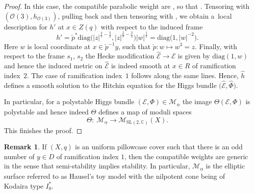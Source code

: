 \documentclass[10pt,a4paper]{amsart}
\numberwithin{equation}{section}
\theoremstyle{definition}
\newtheorem{rema}[theo]{Remark}
\renewcommand{\to}{\rightarrow}
\newcommand{\ualpha}{\underline{\alpha}}
\newcommand{\calE}{\mathcal{E}}
\newcommand{\calM}{\mathcal{M}}
\newcommand{\calO}{\mathcal{O}}
\newcommand{\CC}{\mathbb{C}}
\newcommand{\diag}{\mathrm{diag}}
\newcommand{\SL}{\mathrm{SL}}
\begin{document}
\begin{proof}
 In this case, the compatible parabolic weight are \smash{$\ualpha_y=\bigl(\frac34, \frac14\bigr)$}, so that \smash{$h=\diag\bigl( \vert z \vert^{\frac{4}{3}}, \vert z \vert^{\frac{2}{3}}\bigr)$}. Tensoring with $(\calO(3),h_{\calO(3)})$, pulling back and then tensoring with , we obtain a~local description for $h'$ at $x \in Z(q)$ with respect to the induced frame
 \[ h'= \check{p}^*\diag\bigl( \vert z \vert^{\frac{4}{3}-\frac32}, \vert z \vert^{\frac{2}{3}-\frac32}\bigr) \vert w \vert^{\frac12}= \diag\bigl( 1, \vert w \vert^{-2} \bigr).
 \]
 Here $w$ is local coordinate at $x \in \check{p}^{-1}y$, such that $\check{p}\colon w \mapsto w^3=z$. Finally, with respect to the frame $s_1$, $s_2$ the Hecke modification $\hat{\calE} \to \calE$ is given by $\diag( 1, w)$ and hence the induced metric on $\hat{\calE}$ is indeed smooth at $x \in R$ of ramification index~$2$. The case of ramification index~$1$ follows along the same lines. Hence, $\hat{h}$ defines a smooth solution to the Hitchin equation for the Higgs bundle $\bigl(\hat{\calE},\hat{\Phi}\bigr)$.

 In particular, for a polystable Higgs bundle $(\calE,\Phi) \in \calM_{\ualpha}$ the image $\Theta(\calE,\Phi)$ is polystable and hence indeed $\Theta$ defines a map of moduli spaces
 \[ \Theta\colon \ \calM_{\ualpha} \to \calM_{\SL(2,\CC)}(X).
 \]
 This finishes the proof.
\end{proof}

\begin{rema} If $(X,q)$ is an uniform pillowcase cover such that there is an odd number of $y \in D$ of ramification index $1$, then the compatible weights are generic in the sense that semi-stability implies stability. In particular, $\calM_{\ualpha}$ is the elliptic surface referred to as Hausel's toy model with the nilpotent cone being of Kodaira type $I_0^*$.
\end{rema}
\end{document}
